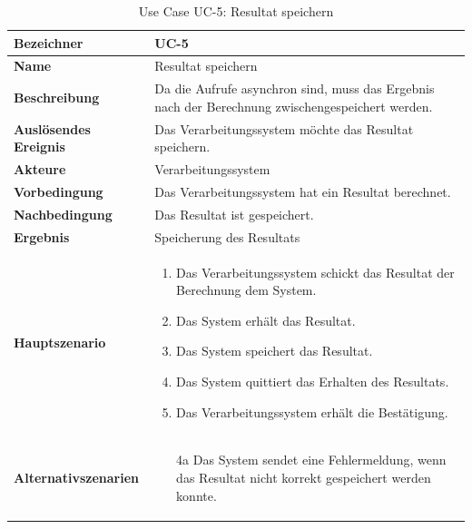 \begin{table}[ht]
\centering
  \begin{tabular}{ l | p{10cm} }
	\hline
	\rowcolor{gray}
	\textbf{Bezeichner}	&	\textbf{UC-5}\\ \hline
	\textbf{Name}			&	Resultat speichern\\ \hline
	\textbf{Beschreibung}	&	Da die Aufrufe asynchron sind, muss das Ergebnis nach der Berechnung zwischengespeichert werden.\\ \hline
	\textbf{Auslösendes Ereignis}&	Das Verarbeitungssystem möchte das Resultat speichern.\\ \hline
	\textbf{Akteure}		&	Verarbeitungssystem\\ \hline
	\textbf{Vorbedingung}	&	Das Verarbeitungssystem hat ein Resultat berechnet.\\ \hline
	\textbf{Nachbedingung}	&	Das Resultat ist gespeichert.\\ \hline
	\textbf{Ergebnis}		&	Speicherung des Resultats\\ \hline
	\textbf{Hauptszenario}	&	\begin{enumerate}
					\item Das Verarbeitungssystem schickt das Resultat der Berechnung dem System.
					\item Das System erhält das Resultat.
					\item Das System speichert das Resultat.
					\item Das System quittiert das Erhalten des Resultats.
					\item Das Verarbeitungssystem erhält die Bestätigung.
					\end{enumerate}
					\\ \hline
	\textbf{Alternativszenarien}	&	\begin{enumerate}
					\item[4a] Das System sendet eine Fehlermeldung, wenn das Resultat nicht korrekt gespeichert werden konnte.
					\end{enumerate}
					\\ \hline
  \end{tabular}
   \caption{Use Case UC-5: Resultat speichern}\label{table:use_case_5}
\end{table}


